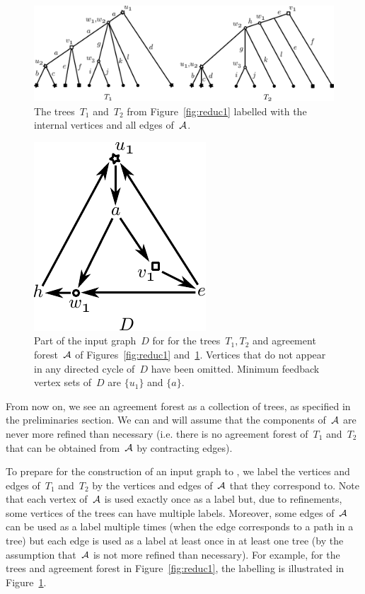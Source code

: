 \begin{figure}
 \centering
 \includegraphics[scale=.8]{../figs/fig_reduc3.pdf}
 \caption{The trees~$T_1$ and~$T_2$ from Figure~\ref{fig:reduc1} labelled with the internal vertices and all edges of~${\mathcal A}$.\label{fig:reduc3}}
\end{figure}

\begin{figure}
 \centering
 \includegraphics[scale=.9]{../figs/fig_reduc4.pdf}
 \caption{Part of the input graph~$D$ for \dfvs for the trees~$T_1,T_2$ and agreement forest~${\mathcal A}$ of Figures~\ref{fig:reduc1} and~\ref{fig:reduc3}. Vertices that do not appear in any directed cycle of~$D$ have been omitted. Minimum feedback vertex sets of~$D$ are $\{u_1\}$ and $\{a\}$.\label{fig:reduc4}}
\end{figure}

From now on, we see an agreement forest as a collection of trees, as specified in the preliminaries section. We can and will assume that the components of~${\mathcal A}$ are never more refined than necessary (i.e. there is no agreement forest of~$T_1$ and~$T_2$ that can be obtained from~${\mathcal A}$ by contracting edges).

To prepare for the construction of an input graph to \dfvs, we label the vertices and edges of~$T_1$ and~$T_2$ by the vertices and edges of~${\mathcal A}$ that they correspond to. Note that each vertex of~${\mathcal A}$ is used exactly once as a label but, due to refinements, some vertices of the trees can have multiple labels. Moreover, some edges of~${\mathcal A}$ can be used as a label multiple times (when the edge corresponds to a path in a tree) but each edge is used as a label at least once in at least one tree (by the assumption that~${\mathcal A}$ is not more refined than necessary). For example, for the trees and agreement forest in Figure~\ref{fig:reduc1}, the labelling is illustrated in Figure~\ref{fig:reduc3}.

